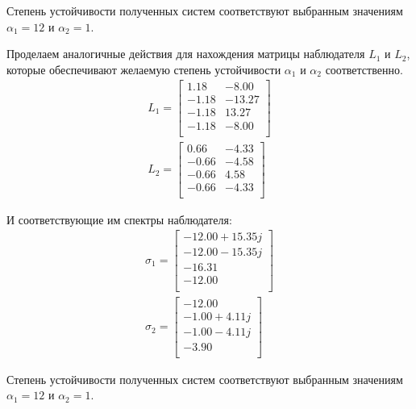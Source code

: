 Степень устойчивости полученных систем соответствуют выбранным значениям $\alpha_1 = 12$ и $\alpha_2 = 1$.

Проделаем аналогичные действия для нахождения матрицы наблюдателя $L_1$ и $L_2$, которые обеспечивают желаемую степень устойчивости $\alpha_1$ и $\alpha_2$ соответственно. 
\begin{eqnarray}
    L_1 = \begin{bmatrix}
        1.18  & -8.00 \\ 
        -1.18  & -13.27 \\ 
        -1.18  & 13.27 \\ 
        -1.18  & -8.00 \\ 
    \end{bmatrix} \\ 
    L_2 =\begin{bmatrix}
        0.66  & -4.33 \\ 
        -0.66  & -4.58 \\ 
        -0.66  & 4.58 \\ 
        -0.66  & -4.33 \\ 
        \end{bmatrix}
\end{eqnarray}

И соответствующие им спектры наблюдателя:
\begin{eqnarray}
    \sigma_1 = \begin{bmatrix}
        -12.00 + 15.35j \\ 
        -12.00 - 15.35j \\ 
        -16.31 \\ 
        -12.00 \\ 
    \end{bmatrix} \\ 
    \sigma_2 = \begin{bmatrix}
        -12.00 \\ 
        -1.00 + 4.11j \\ 
        -1.00 - 4.11j \\ 
        -3.90 \\ 
        \end{bmatrix}
\end{eqnarray}

Степень устойчивости полученных систем соответствуют выбранным значениям $\alpha_1 = 12$ и $\alpha_2 = 1$.

